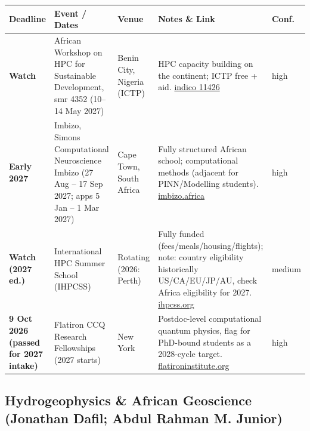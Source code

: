 \documentclass[11pt,a4paper]{article}
\begin{document}
\begin{longtable}{@{}p{3.2cm}p{3.0cm}p{2.5cm}p{5.2cm}p{1.6cm}@{}}
\toprule
\textbf{Deadline} & \textbf{Event / Dates} & \textbf{Venue} & \textbf{Notes \& Link} & \textbf{Conf.} \\
\midrule
\endhead
\textbf{Watch} & African Workshop on HPC for Sustainable Development, smr 4352 (10--14 May 2027) & Benin City, Nigeria (ICTP) & HPC capacity building on the continent; ICTP free + aid. \href{https://indico.ictp.it/event/11426/}{indico 11426} & high \\
\midrule
\textbf{Early 2027} & Imbizo, Simons Computational Neuroscience Imbizo (27 Aug -- 17 Sep 2027; apps 5 Jan -- 1 Mar 2027) & Cape Town, South Africa & Fully structured African school; computational methods (adjacent for PINN/Modelling students). \href{https://www.imbizo.africa/}{imbizo.africa} & high \\
\midrule
\textbf{Watch (2027 ed.)} & International HPC Summer School (IHPCSS) & Rotating (2026: Perth) & Fully funded (fees/meals/housing/flights); note: country eligibility historically US/CA/EU/JP/AU, check Africa eligibility for 2027. \href{https://www.ihpcss.org/}{ihpcss.org} & medium \\
\midrule
\textbf{9 Oct 2026 (passed for 2027 intake)} & Flatiron CCQ Research Fellowships (2027 starts) & New York & Postdoc-level computational quantum physics, flag for PhD-bound students as a 2028-cycle target. \href{https://www.flatironinstitute.org/careers/}{flatironinstitute.org} & high \\
\bottomrule
\end{longtable}

\subsection{Hydrogeophysics \& African Geoscience (Jonathan Dafil; Abdul Rahman M. Junior)}
\end{document}
